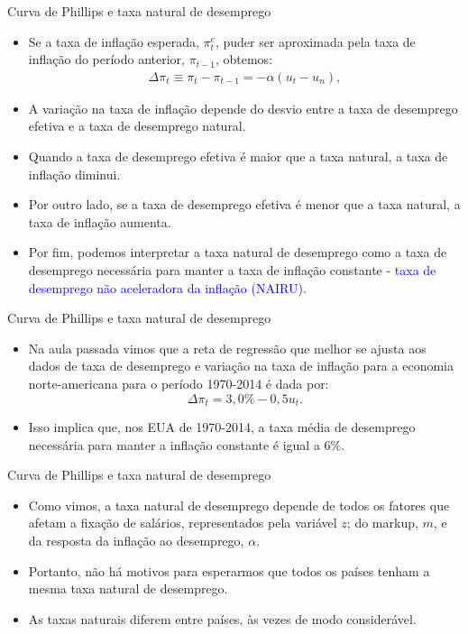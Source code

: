 \documentclass[10pt]{beamer}
\begin{document}
\begin{frame}{Curva de Phillips e taxa natural de desemprego}
    \begin{itemize}
        \item Se a taxa de inflação esperada, $\pi^e_t$, puder ser aproximada pela taxa de inflação do período anterior, $\pi_{t-1}$, obtemos:
        \begin{eqnarray}
            \Delta \pi_t \equiv \pi_t - \pi_{t-1} = -\alpha (u_t - u_n), \label{eq4}
        \end{eqnarray}
        \bigskip
        \item A variação na taxa de inflação depende do desvio entre a taxa de desemprego efetiva e a taxa de desemprego natural.
        \bigskip
        \item Quando a taxa de desemprego efetiva é maior que a taxa natural, a taxa de inflação diminui.
        \bigskip
        \item Por outro lado, se a taxa de desemprego efetiva é menor que a taxa natural, a taxa de inflação aumenta.
        \bigskip
        \item Por fim, podemos interpretar a taxa natural de desemprego como a taxa de desemprego necessária para manter a taxa de inflação constante - \textcolor{blue}{taxa de desemprego não aceleradora da inflação (NAIRU)}.
    \end{itemize}
\end{frame}

\begin{frame}{Curva de Phillips e taxa natural de desemprego}
    \begin{itemize}
        \item Na aula passada vimos que a reta de regressão que melhor se ajusta aos dados de taxa de desemprego e variação na taxa de inflação para a economia norte-americana para o período 1970-2014 é dada por:
        \[
        \Delta \pi_t = 3,0\% - 0,5u_t.
        \]
        \bigskip
        \item Isso implica que, nos EUA de 1970-2014, a taxa média de desemprego necessária para manter a inflação constante é igual a 6\%.
    \end{itemize}
\end{frame}

\begin{frame}{Curva de Phillips e taxa natural de desemprego}
    \begin{itemize}
        \item Como vimos, a taxa natural de desemprego depende de todos os fatores que afetam a fixação de salários, representados pela variável $z$; do markup, $m$, e da resposta da inflação ao desemprego, $\alpha$.
        \bigskip
        \item Portanto, não há motivos para esperarmos que todos os países tenham a mesma taxa natural de desemprego.
        \bigskip
        \item As taxas naturais diferem entre países, às vezes de modo considerável.
    \end{itemize}
\end{frame}
\end{document}
